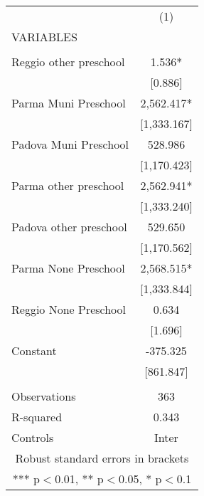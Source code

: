 \begin{tabular}{lc} \hline
 & (1) \\
VARIABLES &  \\ \hline
 &  \\
Reggio other preschool & 1.536* \\
 & [0.886] \\
Parma Muni Preschool & 2,562.417* \\
 & [1,333.167] \\
Padova Muni Preschool & 528.986 \\
 & [1,170.423] \\
Parma other preschool & 2,562.941* \\
 & [1,333.240] \\
Padova other preschool & 529.650 \\
 & [1,170.562] \\
Parma None Preschool & 2,568.515* \\
 & [1,333.844] \\
Reggio None Preschool & 0.634 \\
 & [1.696] \\
Constant & -375.325 \\
 & [861.847] \\
 &  \\
Observations & 363 \\
R-squared & 0.343 \\
 Controls & Inter \\ \hline
\multicolumn{2}{c}{ Robust standard errors in brackets} \\
\multicolumn{2}{c}{ *** p$<$0.01, ** p$<$0.05, * p$<$0.1} \\
\end{tabular}
